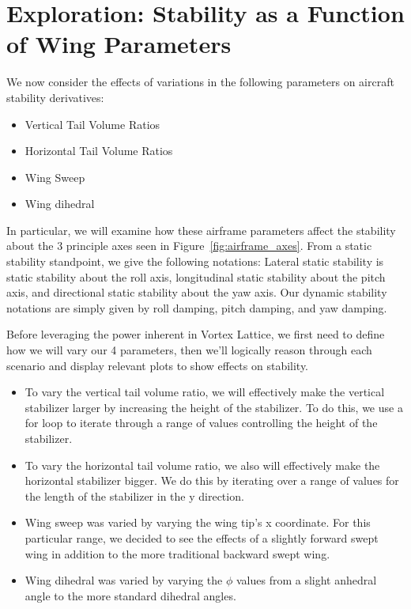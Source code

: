 \documentclass{report}
\begin{document}
\section{Exploration: Stability as a Function of Wing Parameters}
We now consider the effects of variations in the following parameters on aircraft stability derivatives:
\begin{itemize}
    \item[-] Vertical Tail Volume Ratios
    \item[-] Horizontal Tail Volume Ratios
    \item[-] Wing Sweep
    \item[-] Wing dihedral
\end{itemize}

In particular, we will examine how these airframe parameters affect the stability about the 3 principle axes seen in Figure~\ref{fig:airframe_axes}. 
From a static stability standpoint, we give the following notations: Lateral static stability is static stability about the roll axis, longitudinal static stability about the pitch axis, and directional static stability about the yaw axis.
Our dynamic stability notations are simply given by roll damping, pitch damping, and yaw damping.

Before leveraging the power inherent in Vortex Lattice, we first need to define how we will vary our 4 parameters, then we'll logically reason through each scenario and display relevant plots to show effects on stability.

\begin{itemize}
    \item[-] To vary the vertical tail volume ratio, we will effectively make the vertical stabilizer larger by increasing the height of the stabilizer. To do this, we use a for loop to iterate through a range of values controlling the height of the stabilizer.
    \item[-] To vary the horizontal tail volume ratio, we also will effectively make the horizontal stabilizer bigger. We do this by iterating over a range of values for the length of the stabilizer in the y direction.
    \item[-] Wing sweep was varied by varying the wing tip's x coordinate. For this particular range, we decided to see the effects of a slightly forward swept wing in addition to the more traditional backward swept wing.
    \item[-] Wing dihedral was varied by varying the $\phi$ values from a slight anhedral angle to the more standard dihedral angles.

\end{itemize}
\end{document}
